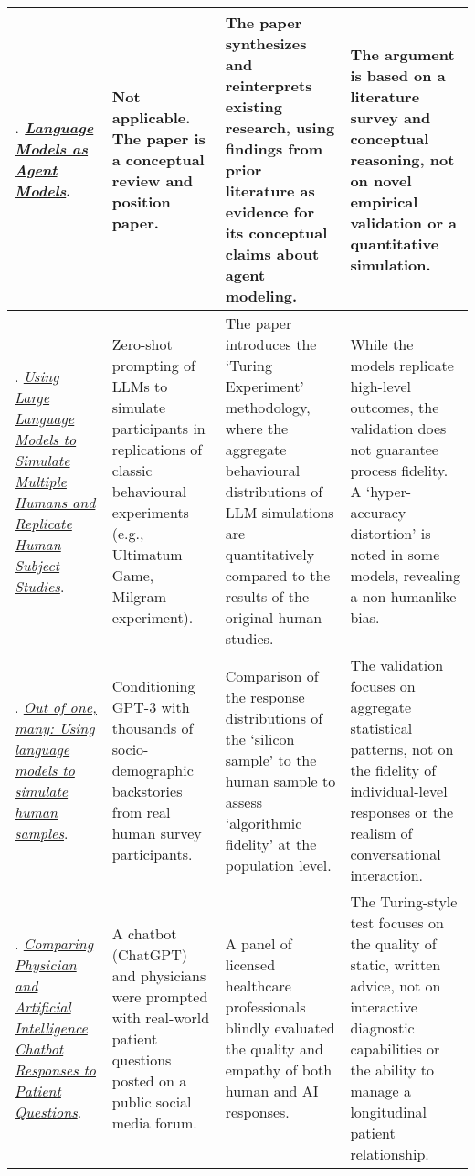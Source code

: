 {\begin{longtable}{| L{4.5cm} | L{3.5cm} | L{3.5cm} | L{3.5cm} |}
\citet{andreas-2022-language}. \href{https://aclanthology.org/2022.findings-emnlp.423/}{\textit{Language Models as Agent Models}}. & Not applicable. The paper is a conceptual review and position paper. & The paper synthesizes and reinterprets existing research, using findings from prior literature as evidence for its conceptual claims about agent modeling. & The argument is based on a literature survey and conceptual reasoning, not on novel empirical validation or a quantitative simulation.
\\\hline
\citet{aher2023}. \href{https://proceedings.mlr.press/v202/aher23a.html}{\textit{Using Large Language Models to Simulate Multiple Humans and Replicate Human Subject Studies}}. & Zero-shot prompting of LLMs to simulate participants in replications of classic behavioural experiments (e.g., Ultimatum Game, Milgram experiment). & The paper introduces the `Turing Experiment' methodology, where the aggregate behavioural distributions of LLM simulations are quantitatively compared to the results of the original human studies. & While the models replicate high-level outcomes, the validation does not guarantee process fidelity. A `hyper-accuracy distortion' is noted in some models, revealing a non-humanlike bias.
\\\hline
\citet{argyle2023}. \href{https://doi.org/10.1017/pan.2023.2}{\textit{Out of one, many: Using language models to simulate human samples}}. & Conditioning GPT-3 with thousands of socio-demographic backstories from real human survey participants. & Comparison of the response distributions of the `silicon sample' to the human sample to assess `algorithmic fidelity' at the population level. & The validation focuses on aggregate statistical patterns, not on the fidelity of individual-level responses or the realism of conversational interaction.
\\\hline
\citet{ayers2023social}. \href{https://jamanetwork.com/journals/jamainternalmedicine/fullarticle/2804309}{\textit{Comparing Physician and Artificial Intelligence Chatbot Responses to Patient Questions}}. & A chatbot (ChatGPT) and physicians were prompted with real-world patient questions posted on a public social media forum. & A panel of licensed healthcare professionals blindly evaluated the quality and empathy of both human and AI responses. & The Turing-style test focuses on the quality of static, written advice, not on interactive diagnostic capabilities or the ability to manage a longitudinal patient relationship.
\\\hline

\end{longtable}}

